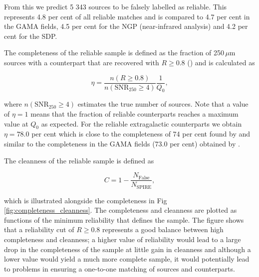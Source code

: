 \documentclass[fleqn,usenatbib]{mnras}
\begin{document}
From this we predict 5 343 sources to be falsely labelled as reliable. This represents 4.8 per cent of all reliable matches and is compared to 4.7 per cent in the GAMA fields, 4.5 per cent for the NGP (near-infrared analysis) and 4.2 per cent for the SDP.

The completeness of the reliable sample is defined as the fraction of 250\,$\mu$m sources with a counterpart that are recovered with $R \geq 0.8$ (\citealt{Smith_2011}) and is calculated as

\begin{equation}
\label{eq:completeness}
\eta = \frac{n(R \geq 0.8)}{n(\textrm{SNR}_{250} \geq 4)}\frac{1}{Q_0},
\end{equation}

\noindent where $n(\textrm{SNR}_{250} \geq 4)$ estimates the true number of sources. Note that a value of $\eta = 1$ means that the fraction of reliable counterparts reaches a maximum value at $Q_0$ as expected. For the reliable extragalactic counterparts we obtain $\eta = 78.0$ per cent which is close to the completeness of 74 per cent found by \citealt{Furlanetto_2018} and similar to the completeness in the GAMA fields (73.0 per cent) obtained by \citealt{Bourne_2016}.

The cleanness of the reliable sample is defined as

\begin{equation}
\label{eq:cleanness}
C = 1 - \frac{N_{\textrm{False}}}{N_{\textrm{SPIRE}}},
\end{equation}

\noindent which is illustrated alongside the completeness in Fig \ref{fig:completeness_cleanness}. The completeness and cleanness are plotted as functions of the minimum reliability that defines the sample. The figure shows that a reliability cut of $R \geq 0.8$ represents a good balance between high completeness and cleanness; a higher value of reliability would lead to a large drop in the completeness of the sample at little gain in cleanness and although a lower value would yield a much more complete sample, it would potentially lead to problems in ensuring a one-to-one matching of sources and counterparts. 
\end{document}
